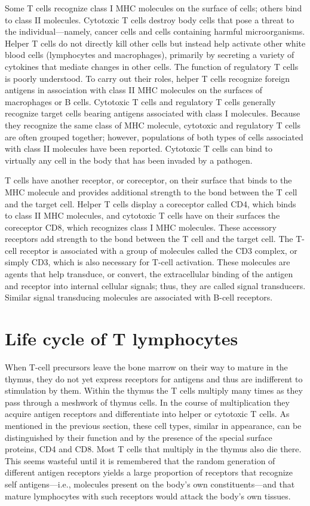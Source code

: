Some T cells recognize class I MHC molecules on the surface of cells; others bind to class II molecules. Cytotoxic T cells destroy body cells that pose a threat to the individual—namely, cancer cells and cells containing harmful microorganisms. Helper T cells do not directly kill other cells but instead help activate other white blood cells (lymphocytes and macrophages), primarily by secreting a variety of cytokines that mediate changes in other cells. The function of regulatory T cells is poorly understood. To carry out their roles, helper T cells recognize foreign antigens in association with class II MHC molecules on the surfaces of macrophages or B cells. Cytotoxic T cells and regulatory T cells generally recognize target cells bearing antigens associated with class I molecules. Because they recognize the same class of MHC molecule, cytotoxic and regulatory T cells are often grouped together; however, populations of both types of cells associated with class II molecules have been reported. Cytotoxic T cells can bind to virtually any cell in the body that has been invaded by a pathogen.

T cells have another receptor, or coreceptor, on their surface that binds to the MHC molecule and provides additional strength to the bond between the T cell and the target cell. Helper T cells display a coreceptor called CD4, which binds to class II MHC molecules, and cytotoxic T cells have on their surfaces the coreceptor CD8, which recognizes class I MHC molecules. These accessory receptors add strength to the bond between the T cell and the target cell.
The T-cell receptor is associated with a group of molecules called the CD3 complex, or simply CD3, which is also necessary for T-cell activation. These molecules are agents that help transduce, or convert, the extracellular binding of the antigen and receptor into internal cellular signals; thus, they are called signal transducers. Similar signal transducing molecules are associated with B-cell receptors.

\section{Life cycle of T lymphocytes}
When T-cell precursors leave the bone marrow on their way to mature in the thymus, they do not yet express receptors for antigens and thus are indifferent to stimulation by them. Within the thymus the T cells multiply many times as they pass through a meshwork of thymus cells. In the course of multiplication they acquire antigen receptors and differentiate into helper or cytotoxic T cells. As mentioned in the previous section, these cell types, similar in appearance, can be distinguished by their function and by the presence of the special surface proteins, CD4 and CD8. Most T cells that multiply in the thymus also die there. This seems wasteful until it is remembered that the random generation of different antigen receptors yields a large proportion of receptors that recognize self antigens—i.e., molecules present on the body’s own constituents—and that mature lymphocytes with such receptors would attack the body’s own tissues.


